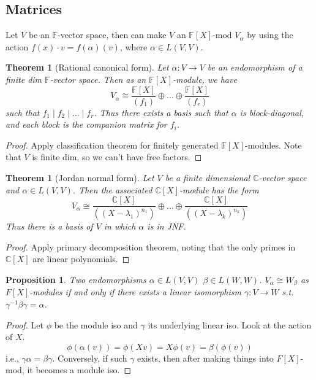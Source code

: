 \documentclass{article}
\theoremstyle{definition}
\theoremstyle{remark}
\theoremstyle{plain}
\newtheorem{thm}[defn]{Theorem}
\newtheorem{prop}[defn]{Proposition}
\theoremstyle{definition}
\newcommand{\CC}{\mathbb{C}}
\newcommand{\FF}{\mathbb{F}}
\begin{document}
\subsection{Matrices}
Let $V$ be an $\FF$-vector space, then can make $V$ an $\FF[X]$-mod $V_\alpha$ by using the action $f(x)\cdot v=f(\alpha)(v)$, where $\alpha\in L(V,V)$.
\begin{thm}[Rational canonical form]
    Let $\alpha:V\to V$ be an endomorphism of a finite dim $\FF$-vector space. Then as an $\FF[X]$-module, we have
    \[V_\alpha\cong\dfrac{\FF[X]}{(f_1)}\oplus\ldots\oplus\dfrac{\FF[X]}{(f_r)}\]
    such that $f_1\mid f_2\mid\ldots\mid f_r$. Thus there exists a basis such that $\alpha$ is block-diagonal, and each block is the companion matrix for $f_i$.
\end{thm}
\begin{proof}
    Apply classification theorem for finitely generated $\FF[X]$-modules. Note that $V$ is finite dim, so we can't have free factors.
\end{proof}
\begin{thm}[Jordan normal form]
    Let $V$ be a finite dimensional $\CC$-vector space and $\alpha\in L(V,V)$. Then the associated $\CC[X]$-module has the form
    \[V_\alpha\cong\dfrac{\CC[X]}{((X-\lambda_1)^{n_1})}\oplus\ldots\oplus\dfrac{\CC[X]}{((X-\lambda_k)^{n_k})}\]
    Thus there is a basis of $V$ in which $\alpha$ is in JNF.
\end{thm}
\begin{proof}
    Apply primary decomposition theorem, noting that the only primes in $\CC[X]$ are linear polynomials.
\end{proof}
\begin{prop}
    Two endomorphisms $\alpha\in L(V,V)$ $\beta\in L(W,W)$. $V_\alpha\cong W_\beta$ as $F[X]$-modules if and only if there exists a linear isomorphism $\gamma:V\to W$ s.t. $\gamma^{-1}\beta\gamma=\alpha$.
\end{prop}
\begin{proof}
    Let $\phi$ be the module iso and $\gamma$ its underlying linear iso. Look at the action of $X$.
    \[\phi(\alpha(v))=\phi(Xv)=X\phi(v)=\beta(\phi(v))\]
    i.e., $\gamma\alpha=\beta\gamma$. Conversely, if such $\gamma$ exists, then after making things into $F[X]$-mod, it becomes a module iso.
\end{proof}
\end{document}
